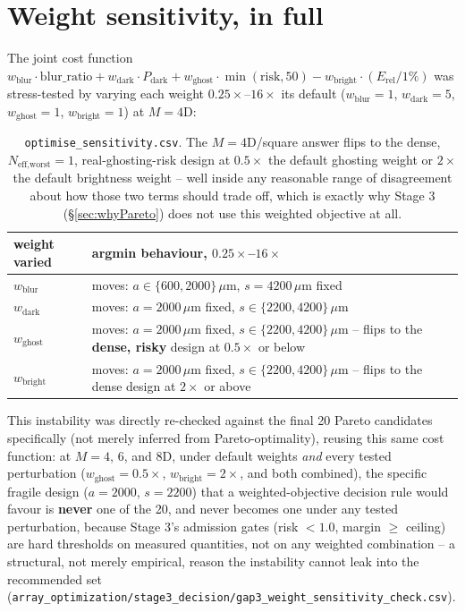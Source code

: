 \documentclass[11pt]{report}
\newcommand{\Erel}{E_{\text{rel}}}
\begin{document}
\section{Weight sensitivity, in full}
\label{sec:sensitivityfull}
The joint cost function $w_{\text{blur}}\cdot\text{blur\_ratio} + w_{\text{dark}}\cdot
P_{\text{dark}} + w_{\text{ghost}}\cdot\min(\text{risk},50) - w_{\text{bright}}\cdot
(\Erel/1\%)$ was stress-tested by varying each weight $0.25\times$--$16\times$ its default
($w_{\text{blur}}{=}1$, $w_{\text{dark}}{=}5$, $w_{\text{ghost}}{=}1$, $w_{\text{bright}}{=}1$)
at $M{=}4$D:
\begin{table}[h!]
\centering\small
\begin{tabular}{lp{9.5cm}}
\toprule
\textbf{weight varied} & \textbf{argmin behaviour, $0.25\times$--$16\times$} \\
\midrule
$w_{\text{blur}}$ & moves: $a\in\{600,2000\}\,\mu$m, $s{=}4200\,\mu$m fixed \\
$w_{\text{dark}}$ & moves: $a{=}2000\,\mu$m fixed, $s\in\{2200,4200\}\,\mu$m \\
$w_{\text{ghost}}$ & moves: $a{=}2000\,\mu$m fixed, $s\in\{2200,4200\}\,\mu$m -- flips to
the \textbf{dense, risky} design at $0.5\times$ or below \\
$w_{\text{bright}}$ & moves: $a{=}2000\,\mu$m fixed, $s\in\{2200,4200\}\,\mu$m -- flips to
the dense design at $2\times$ or above \\
\bottomrule
\end{tabular}
\caption{\texttt{optimise\_sensitivity.csv}. The $M{=}4$D/square answer flips to the dense,
$N_{\text{eff,worst}}{=}1$, real-ghosting-risk design at $0.5\times$ the default ghosting
weight or $2\times$ the default brightness weight -- well inside any reasonable range of
disagreement about how those two terms should trade off, which is exactly why Stage 3
(\S\ref{sec:whyPareto}) does not use this weighted objective at all.}
\end{table}
This instability was directly re-checked against the final 20 Pareto candidates specifically
(not merely inferred from Pareto-optimality), reusing this same cost function: at $M{=}4$,
$6$, and $8$D, under default weights \emph{and} every tested perturbation
($w_{\text{ghost}}{=}0.5\times$, $w_{\text{bright}}{=}2\times$, and both combined), the
specific fragile design ($a{=}2000$, $s{=}2200$) that a weighted-objective decision rule
would favour is \textbf{never} one of the 20, and never becomes one under any tested
perturbation, because Stage 3's admission gates (risk $<1.0$, margin $\geq$ ceiling) are hard
thresholds on measured quantities, not on any weighted combination -- a structural, not
merely empirical, reason the instability cannot leak into the recommended set
(\texttt{array\_optimization/stage3\_decision/gap3\_weight\_sensitivity\_check.csv}).
\end{document}

